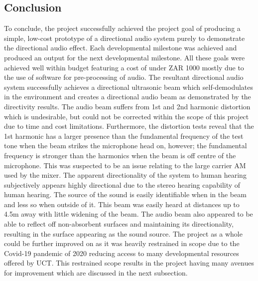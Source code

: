 \subsection{Conclusion}
To conclude, the project successfully achieved the project goal of producing a simple, low-cost prototype of a directional audio system purely to demonstrate the directional audio effect. Each developmental milestone was achieved and produced an output for the next developmental milestone. All these goals were achieved well within budget featuring a cost of under ZAR 1000 mostly due to the use of software for pre-processing of audio. The resultant directional audio system successfully achieves a directional ultrasonic beam which self-demodulates in the environment and creates a directional audio beam as demonstrated by the directivity results. The audio beam suffers from 1st and 2nd harmonic distortion which is undesirable, but could not be corrected within the scope of this project due to time and cost limitations. Furthermore, the distortion tests reveal that the 1st harmonic has a larger presence than the fundamental frequency of the test tone when the beam strikes the microphone head on, however; the fundamental frequency is stronger than the harmonics when the beam is off centre of the microphone. This was suspected to be an issue relating to the large carrier AM used by the mixer. The apparent directionality of the system to human hearing subjectively appears highly directional due to the stereo hearing capability of human hearing. The source of the sound is easily identifiable when in the beam and less so when outside of it. This beam was easily heard at distances up to 4.5m away with little widening of the beam. The audio beam also appeared to be able to reflect off non-absorbent surfaces and maintaining its directionality, resulting in the surface appearing as the sound source. The project as a whole could be further improved on as it was heavily restrained in scope due to the Covid-19 pandemic of 2020 reducing access to many developmental resources offered by UCT. This restrained scope results in the project having many avenues for improvement which are discussed in the next subsection.

